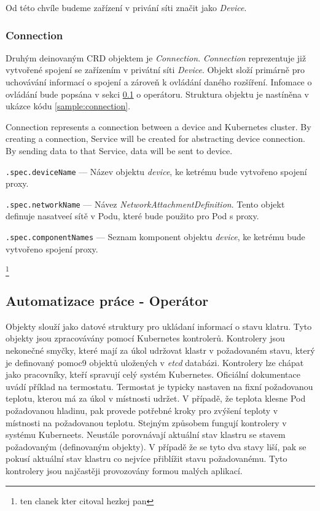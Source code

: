 Od této chvíle budeme zařízení v privání síti značit jako \textit{Device}.

\subsubsection*{Connection}
Druhým deinovaným CRD objektem je \textit{Connection}. \textit{Connection} reprezentuje již vytvořené spojení se zařízením v privátní síti \textit{Device}. Objekt složí primárně pro uchovávání informací o spojení a zároveň k ovládání daného rozšíření. Infomace o ovládání bude popsána v sekci \ref{sec:operator} o operátoru. Struktura objektu je nastíněna v ukázce kódu \ref{sample:connection}.


Connection represents a connection between a device and Kubernetes cluster. By creating a connection, Service will be created for abstracting device connection. By sending data to that Service, data will be sent to device.



\begin{description}
    \item \verb|.spec.deviceName| --- Název objektu \textit{device}, ke ketrému bude vytvořeno spojení proxy. 
    \item \verb|.spec.networkName| --- Návez \textit{NetworkAttachmentDefinition}. Tento objekt definuje nasatveeí sítě v Podu, které bude použito pro Pod s proxy.
    \item \verb|.spec.componentNames| --- Seznam komponent objektu \textit{device}, ke ketrému bude vytvořeno spojení proxy. 
\end{description}
\footnote{ten clanek kter citoval hezkej pan}

\subsection{Automatizace práce - Operátor}\label{sec:operator}
Objekty slouží jako datové struktury pro ukládaní informací o stavu klatru. Tyto objekty jsou zpracovávány pomocí Kubernetes kontrolerů. Kontrolery jsou nekonečné smyčky, které mají za úkol udržovat klastr v požadovaném stavu, který je definovaný pomoc9 objektů uložených v \textit{etcd} databázi. Kontrolery lze chápat jako pracovníky, kteří spravují celý systém Kubernetes. Oficiální dokumentace uvádí příklad na termostatu. Termostat je typicky nastaven na fixní požadovanou teplotu, kterou má za úkol v místnosti udržet. V případě, že teplota klesne Pod požadovanou hladinu, pak provede potřebné kroky pro zvýšení teploty v místnosti na požadovanou teplotu. Stejným způsobem fungují kontrolery v systému Kuberneets. Neustále porovnávají aktuální stav klastru se stavem požadovaným (definovaným objekty). V případě že se tyto dva stavy liší, pak se pokusí aktuální stav klastru co nejvíce přiblížit stavu požadovanému. Tyto kontrolery jsou najčastěji provozovány formou malých aplikací.

